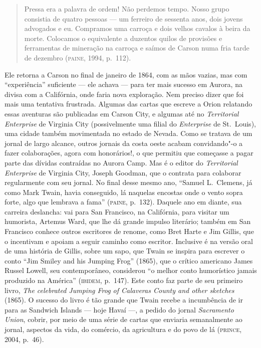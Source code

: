 \begin{quote}
Pressa era a palavra de ordem! Não perdemos tempo. Nosso grupo
consistia de quatro pessoas --- um ferreiro de sessenta anos, dois
jovens advogados e eu. Compramos uma carroça e dois velhos cavalos à
beira da morte. Colocamos o equivalente a duzentos quilos de provisões
e ferramentas de mineração na carroça e saímos de Carson numa fria
tarde de dezembro (\textsc{paine}, 1994, p.~112).
\end{quote}

Ele retorna a Carson no final de janeiro de 1864, com as mãos vazias,
mas com ``experiência'' suficiente --- ele achava 
--- para ter mais sucesso em Aurora, na divisa com a Califórnia, onde faria
nova exploração. Nem preciso dizer que foi mais uma tentativa
frustrada. Algumas das cartas que escreve a Orion relatando essas
aventuras são publicadas em Carson City, e algumas até no
\textit{Territorial Enterprise} de Virginia City (possivelmente uma filial do
\textit{Enterprise} de St.~Louis), uma cidade também movimentada no estado de
Nevada. Como se tratava de um jornal de largo alcance, outros jornais da
costa oeste acabam convidando"-o a fazer colaborações, agora com honorários!, o
que permitiu que começasse a pagar parte das dívidas contraídas no Aurora
Camp. Mas é o editor do \textit{Territorial Enterprise} de Virginia City, Joseph
Goodman, que o contrata para colaborar regularmente com seu jornal. No
final desse mesmo ano, ``Samuel L.~Clemens, já como Mark
Twain, havia conseguido, lá naquelas encostas onde o vento sopra forte,
algo que lembrava a fama'' (\textsc{paine}, p.~132).
Daquele ano em diante, sua carreira deslancha: vai para San Francisco, na
Califórnia, para visitar um humorista, Artemus Ward, que lhe dá grande
impulso literário; também em San Francisco conhece outros escritores de
renome, como Bret Harte e Jim Gillis, que o incentivam e apoiam a seguir
caminho como escritor. Inclusive é na versão oral de uma história de
Gillis, sobre um sapo, que Twain se inspira para escrever o conto
``Jim Smiley and his Jumping Frog'' (1865), que
o crítico americano James Russel Lowell, seu contemporâneo,
considerou ``o melhor conto humorístico jamais produzido na
América'' (\textsc{ibidem}, p.~147). Este conto faz parte de seu
primeiro livro, \textit{The celebrated Jumping Frog of Calaveras County and other
sketches} (1865). O sucesso do livro é tão grande que Twain recebe a incumbência
de ir para as Sandwich Islands --- hoje Havaí ---, a pedido do jornal
\textit{Sacramento Union}, cobrir, por meio de uma série de cartas que
enviaria semanalmente ao jornal, aspectos da vida, do comércio, da
agricultura e do povo de lá (\textsc{prince}, 2004, p.~46).

